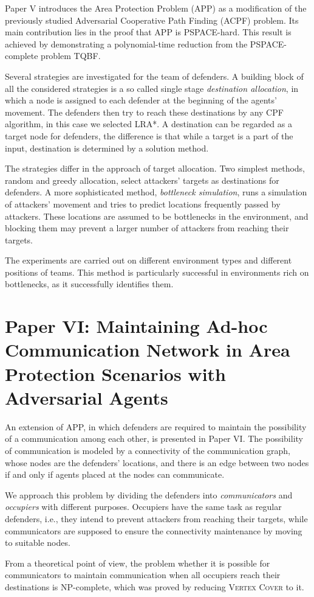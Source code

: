 Paper V introduces the Area Protection Problem (APP) as a modification of the previously studied Adversarial Cooperative Path Finding (ACPF) \cite{ivanova14} problem.
Its main contribution lies in the proof that APP is PSPACE-hard.
This result is achieved by demonstrating a polynomial-time reduction from the PSPACE-complete problem TQBF.

Several strategies are investigated for the team of defenders.
A building block of all the considered strategies is a so called single stage \emph{destination allocation}, in which a node is assigned to each defender at the beginning of the agents' movement.
The defenders then try to reach these destinations by any CPF algorithm, in this case we selected LRA*.
A destination can be regarded as a target node for defenders, the difference is that while a target is a part of the input, destination is determined by a solution method.

The strategies differ in the approach of target allocation.
Two simplest methods, random and greedy allocation, select attackers' targets as destinations for defenders.
A more sophisticated method, \emph{bottleneck simulation}, runs a simulation of attackers' movement and tries to predict locations frequently passed by attackers.
These locations are assumed to be bottlenecks in the environment, and blocking them may prevent a larger number of attackers from reaching their targets.

The experiments are carried out on different environment types and different positions of teams.
This method is particularly successful in environments rich on bottlenecks, as it successfully identifies them.
%
%
\section{Paper VI: Maintaining Ad-hoc Communication Network in Area Protection Scenarios with Adversarial Agents}

An extension of APP, in which defenders are required to maintain the possibility of a communication among each other, is presented in Paper VI.
The possibility of communication is modeled by a connectivity of the communication graph, whose nodes are the defenders' locations, 
and there is an edge between two nodes if and only if agents placed at the nodes can communicate.

We approach this problem by dividing the defenders into \emph{communicators} and \emph{occupiers} with different purposes. 
Occupiers have the same task as regular defenders, i.e., they intend to prevent attackers from reaching their targets, 
while communicators are supposed to ensure the connectivity maintenance by moving to suitable nodes.

From a theoretical point of view, the problem whether it is possible for communicators to maintain communication when all occupiers reach their destinations is NP-complete, 
which was proved by reducing \textsc{Vertex Cover} to it.
